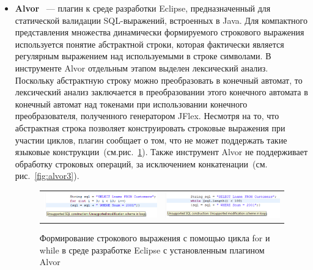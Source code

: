 \documentclass{matmex-diploma}
\begin{document}
\begin{itemize}    
\item \textbf{Alvor}~\cite{Alvor, AlvorUrl} {---} плагин к среде разработки Eclipse, предназначенный для статической валидации SQL-выражений, встроенных в Java. Для компактного представления множества динамически формируемого строкового выражения используется понятие абстрактной строки, которая фактически является регулярным выражением над используемыми в строке символами. В инструменте Alvor отдельным этапом выделен лексический анализ. Поскольку абстрактную строку можно преобразовать в конечный автомат, то лексический анализ заключается в преобразовании этого конечного автомата в конечный автомат над токенами при  использовании конечного преобразователя, полученного генератором JFlex. Несмотря на то, что абстрактная строка позволяет конструировать строковые выражения при участии циклов, плагин сообщает о том, что не может поддержать такие языковые конструкции~(см.рис.~\ref{fig:alvor2}). Также инструмент Alvor не поддерживает обработку строковых операций, за исключением конкатенации~(см. рис.~\ref{fig:alvor3}).


\begin{figure}[h!]
\begin{center}
\begin{tabular}{  c  c }
\begin{minipage}{.5\textwidth}
  \includegraphics[width=\linewidth]{alvor2}
\end{minipage}
    &
\begin{minipage}{.5\textwidth}
  \includegraphics[width=\linewidth]{alvor1}
\end{minipage}
\end{tabular}    
\caption{Формирование строкового выражения с помощью цикла for и while в среде разработке Eclipse с установленным плагином Alvor}
\label{fig:alvor2} 
\end{center}
\end{figure}


\end{itemize}
\end{document}
